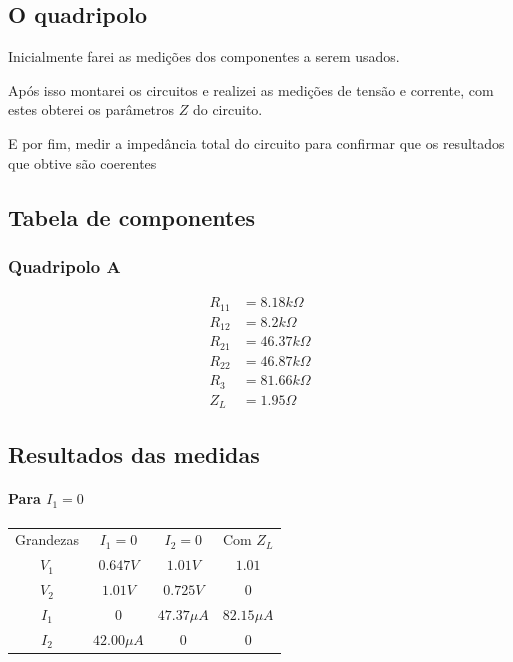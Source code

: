 \documentclass[12pt,twoside, a4paper, twocolumn]{article}
\begin{document}
\subsection{O quadripolo}




Inicialmente farei as medições dos componentes a serem usados.


Após isso montarei os circuitos e realizei as medições de tensão e corrente, com estes obterei os parâmetros $Z$ do circuito.


E por fim, medir a impedância total do circuito para confirmar que os resultados que obtive são coerentes


\subsection{Tabela de componentes}




\subsubsection*{Quadripolo A}
\begin{equation}
    \begin{aligned}
        R_{11} & = 8.18k \varOmega  \\
        R_{12} & = 8.2k \varOmega   \\
        R_{21} & = 46.37k \varOmega \\
        R_{22} & = 46.87k \varOmega \\
        R_{3}  & = 81.66k \varOmega \\
        Z_L    & = 1.95 \varOmega
    \end{aligned}
\end{equation}


\subsection{Resultados das medidas}


\paragraph*{Para $I_1 = 0$}
\begin{center}
    \begin{tabular}{ |c|c|c|c| }
        \hline
        Grandezas & $I_1 = 0$     & $I_2 = 0$     & Com  $Z_L$    \\
        $V_1$     & $0.647 V$     & $1.01 V$      & $1.01$        \\
        $V_2$     & $1.01 V$      & $0.725 V$     & $0$           \\
        $I_1$     & $0$           & $47.37 \mu A$ & $82.15 \mu A$ \\
        $I_2$     & $42.00 \mu A$ & $0$           & $0$           \\


        \hline
    \end{tabular}
\end{center}
\end{document}
